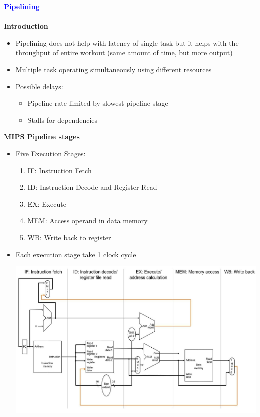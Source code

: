 \documentclass[a4paper]{article} \usepackage[backend=biber, style=numeric, sorting=none]{biblatex}
\begin{document}
\begin{multicols*}{4}
{\small\textbf{\textcolor{blue}{Pipelining}}}
\\\\ \textbf{Introduction}
\begin{itemize}
    \item Pipelining does not help with latency of single task but it helps with the throughput of entire workout (same amount of time, but more output)
    \item Multiple task operating simultaneously using different resources
    \item Possible delays:
        \begin{itemize}
            \item Pipeline rate limited by slowest pipeline stage
            \item Stalls for dependencies\\
        \end{itemize}
\end{itemize}

\textbf{MIPS Pipeline stages}
\begin{itemize}
    \item Five Execution Stages:
    \begin{enumerate}
        \item IF: Instruction Fetch
        \item ID: Instruction Decode and Register Read
        \item EX: Execute
        \item MEM: Access operand in data memory
        \item WB: Write back to register
    \end{enumerate}
    \item Each execution stage take 1 clock cycle

    \includegraphics[width=\columnwidth]{pipelining_stage}
\end{itemize}


\end{multicols*}
\end{document}
